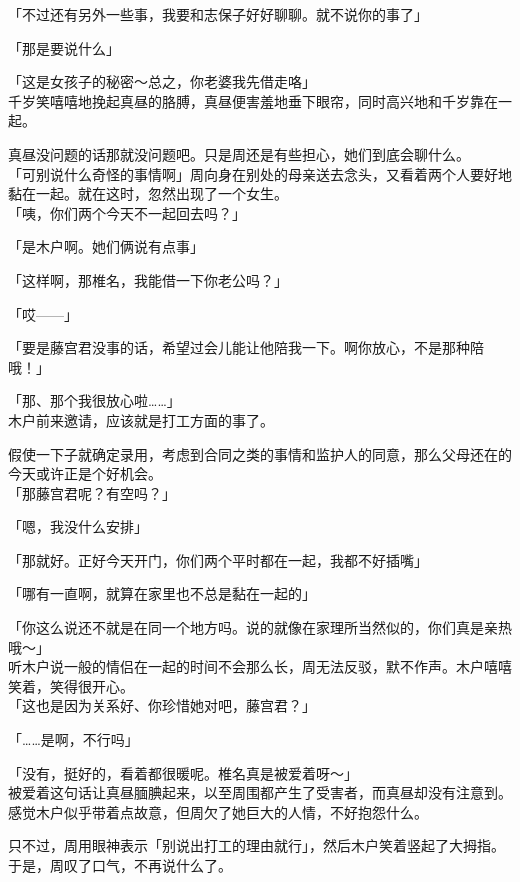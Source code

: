 「不过还有另外一些事，我要和志保子好好聊聊。就不说你的事了」

「那是要说什么」

「这是女孩子的秘密～总之，你老婆我先借走咯」\\

千岁笑嘻嘻地挽起真昼的胳膊，真昼便害羞地垂下眼帘，同时高兴地和千岁靠在一起。

真昼没问题的话那就没问题吧。只是周还是有些担心，她们到底会聊什么。\\

「可别说什么奇怪的事情啊」周向身在别处的母亲送去念头，又看着两个人要好地黏在一起。就在这时，忽然出现了一个女生。\\

「咦，你们两个今天不一起回去吗？」

「是木户啊。她们俩说有点事」

「这样啊，那椎名，我能借一下你老公吗？」

「哎——」

「要是藤宫君没事的话，希望过会儿能让他陪我一下。啊你放心，不是那种陪哦！」

「那、那个我很放心啦……」\\

木户前来邀请，应该就是打工方面的事了。

假使一下子就确定录用，考虑到合同之类的事情和监护人的同意，那么父母还在的今天或许正是个好机会。\\

「那藤宫君呢？有空吗？」

「嗯，我没什么安排」

「那就好。正好今天开门，你们两个平时都在一起，我都不好插嘴」

「哪有一直啊，就算在家里也不总是黏在一起的」

「你这么说还不就是在同一个地方吗。说的就像在家理所当然似的，你们真是亲热哦～」\\

听木户说一般的情侣在一起的时间不会那么长，周无法反驳，默不作声。木户嘻嘻笑着，笑得很开心。\\

「这也是因为关系好、你珍惜她对吧，藤宫君？」

「……是啊，不行吗」

「没有，挺好的，看着都很暖呢。椎名真是被爱着呀～」\\

被爱着这句话让真昼腼腆起来，以至周围都产生了受害者，而真昼却没有注意到。感觉木户似乎带着点故意，但周欠了她巨大的人情，不好抱怨什么。

只不过，周用眼神表示「别说出打工的理由就行」，然后木户笑着竖起了大拇指。于是，周叹了口气，不再说什么了。

